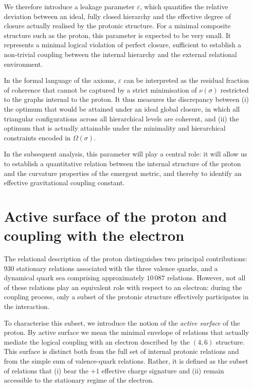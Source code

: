 \documentclass[11pt,a4paper]{article}
\begin{document}
We therefore introduce a leakage parameter \(\varepsilon\), which quantifies the relative deviation between an ideal, fully closed hierarchy and the effective degree of closure actually realised by the protonic structure. For a minimal composite structure such as the proton, this parameter is expected to be very small. It represents a minimal logical violation of perfect closure, sufficient to establish a non‑trivial coupling between the internal hierarchy and the external relational environment. 

In the formal language of the axioms, \(\varepsilon\) can be interpreted as the residual fraction of coherence that cannot be captured by a strict minimisation of \(\nu(\sigma)\) restricted to the graphs internal to the proton. It thus measures the discrepancy between (i) the optimum that would be attained under an ideal global closure, in which all triangular configurations across all hierarchical levels are coherent, and (ii) the optimum that is actually attainable under the minimality and hierarchical constraints encoded in \(\Omega(\sigma)\). 

In the subsequent analysis, this parameter will play a central role: it will allow us to establish a quantitative relation between the internal structure of the proton and the curvature properties of the emergent metric, and thereby to identify an effective gravitational coupling constant.

\section{Active surface of the proton and coupling with the electron}
The relational description of the proton distinguishes two principal contributions: \(930\) stationary relations associated with the three valence quarks, and a dynamical quark sea comprising approximately \(10\,087\) relations. However, not all of these relations play an equivalent role with respect to an electron: during the coupling process, only a subset of the protonic structure effectively participates in the interaction.

To characterise this subset, we introduce the notion of the \emph{active surface} of the proton. By active surface we mean the minimal envelope of relations that actually mediate the logical coupling with an electron described by the \((4,6)\) structure. This surface is distinct both from the full set of internal protonic relations and from the simple sum of valence-quark relations. Rather, it is defined as the subset of relations that (i) bear the \(+1\) effective charge signature and (ii) remain accessible to the stationary regime of the electron.
\end{document}
